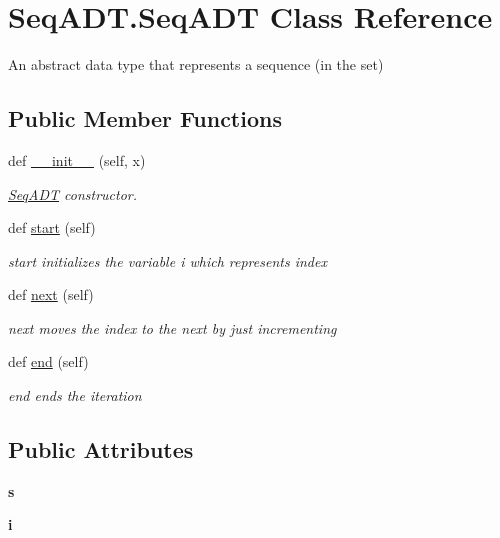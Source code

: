 \hypertarget{class_seq_a_d_t_1_1_seq_a_d_t}{}\section{Seq\+A\+D\+T.\+Seq\+A\+DT Class Reference}
\label{class_seq_a_d_t_1_1_seq_a_d_t}


An abstract data type that represents a sequence (in the set)  


\subsection*{Public Member Functions}
\begin{DoxyCompactItemize}
\item 
def \mbox{\hyperlink{class_seq_a_d_t_1_1_seq_a_d_t_a9330066e7aa744127c86671e1a66e155}{\+\_\+\+\_\+init\+\_\+\+\_\+}} (self, x)
\begin{DoxyCompactList}\small\item\em \mbox{\hyperlink{class_seq_a_d_t_1_1_seq_a_d_t}{Seq\+A\+DT}} constructor. \end{DoxyCompactList}\item 
\mbox{\label{class_seq_a_d_t_1_1_seq_a_d_t_ad89d5ccf139e928a65000f00e605692e}} 
def \mbox{\hyperlink{class_seq_a_d_t_1_1_seq_a_d_t_ad89d5ccf139e928a65000f00e605692e}{start}} (self)
\begin{DoxyCompactList}\small\item\em start initializes the variable i which represents index \end{DoxyCompactList}\item 
def \mbox{\hyperlink{class_seq_a_d_t_1_1_seq_a_d_t_a1d2ee97ccd784507ae32c00150dc6fb0}{next}} (self)
\begin{DoxyCompactList}\small\item\em next moves the index to the next by just incrementing \end{DoxyCompactList}\item 
def \mbox{\hyperlink{class_seq_a_d_t_1_1_seq_a_d_t_a7d8df17dae5df548ca32054075ca04b8}{end}} (self)
\begin{DoxyCompactList}\small\item\em end ends the iteration \end{DoxyCompactList}\end{DoxyCompactItemize}
\subsection*{Public Attributes}
\begin{DoxyCompactItemize}
\item 
\mbox{\label{class_seq_a_d_t_1_1_seq_a_d_t_a1c751be49f197faecbd36352484be18d}} 
{\bfseries s}
\item 
\mbox{\label{class_seq_a_d_t_1_1_seq_a_d_t_a9c8c61691d99a130acbfd6f4c50e3ee0}} 
{\bfseries i}
\end{DoxyCompactItemize}


